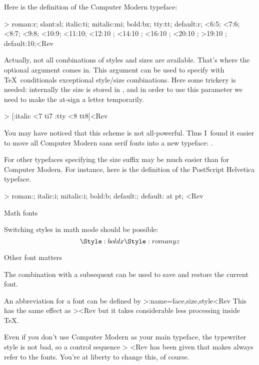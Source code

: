 Here is the definition of the Computer Modern typeface:

\Ver>
    {roman:r; slant:sl; italic:ti; mitalic:mi; bold:bx; tty:tt;
     default:r;}
    {<6:5; <7:6; <8:7; <9:8; <10:9; <11:10; 
     <12:10 \scaled\magstephalf;
     <14:10 \scaled{}; <16:10 \scaled{};
     <20:10 \scaled{}; >19:10 \scaled{};
     default:10;}<Rev

Actually, not all combinations of styles and sizes are available.
That's where the optional argument comes in. This argument can be
used to specify with \TeX\ conditionals exceptional style/size
combinations. Here some trickery is needed: internally the size is
stored in , and in order to use this parameter we need to
make the at-sign a letter temporarily.

\Ver>\makeatletter
{}
    [\ifStyle:italic \ifnum\Fsize<7 ti7\fi\fi
     \ifStyle:tty \ifnum\Fsize<8 tt8\fi\fi]<Rev

You may have noticed that this scheme is not all-powerful. Thus
I~found it easier to move all Computer Modern sans serif fonts into a
new typeface: .

For other typefaces specifying the size suffix may be much easier
than for Computer Modern. For instance, here is the definition of the
PostScript Helvetica typeface.

\Ver>\makeatletter
{}
    {roman:; italic:i; mitalic:i; bold:b; default:;}
    {default: at \Fsize pt;}
\makeatother<Rev


\SubSection Math fonts

Switching styles in math mode should be possible:
$${\Style:bold x\Style:roman y}z$$

\SubSection Other font matters

The combination  with a subsequent 
 can
be used to save and restore the current font.

An abbreviation for a font can be defined by
\Ver>\DefineFont:name=face,size,style<Rev
This has the same effect as
\Ver>\def\name{\TypeFace:face \PointSize:size \Style:style }<Rev
but it takes considerable less processing inside \TeX.

Even if you don't use Computer Modern as your main typeface, the
typewriter style is not bad, so a control sequence
\Ver>
\def\tt{\Typeface:ComputerModern \Style:tty }<Rev
has been given that makes  always refer to the
 fonts. You're at liberty to change this, of course.

